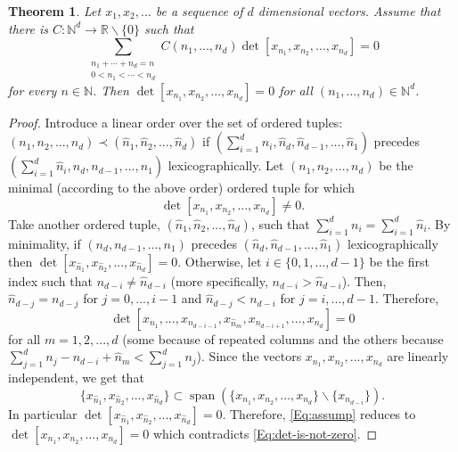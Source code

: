 \documentclass[12pt]{article}
\newcommand{\R}{{\mathbb{R}}}
\newcommand{\N}{{\mathbb{N}}}
\newtheorem*{theorem}{Theorem}
\DeclareMathOperator{\spn}{span}
\begin{document}
\begin{theorem} Let $x_1,x_2,...$ be a sequence of $d$ dimensional vectors. Assume that there is $C: \N^d \to \R \smallsetminus \{0\}$
such that
\begin{equation}\label{Eq:assump}
\sum_{\substack{n_1+\cdots+n_d=n \\ 0< n_1 < \cdots < n_d }}C(n_1,...,n_d) \det[x_{n_1},x_{n_2},...,x_{n_d}] = 0
\end{equation} for every $n \in \N$. Then $\det[x_{n_1},x_{n_2},...,x_{n_d}]\!=\!0$ for all $(n_1,...,n_d) \in \N^d$. \end{theorem}
\begin{proof}
Introduce a linear order over the set of ordered tuples: $(n_1,n_2,...,n_d) \prec (\hat{n}_1,\hat{n}_2,...,\hat{n}_d)$ if $\left(\sum_{i=1}^d n_i,\hat{n}_d,\hat{n}_{d-1},...,\hat{n}_1\right)$ precedes $\left(\sum_{i=1}^d\hat{n}_i,n_d,n_{d-1},...,n_1\right)$
lexicographically. Let $(n_1,n_2,...,n_d)$ be the minimal (according to the above order) ordered tuple for which
\begin{equation}\label{Eq:det-is-not-zero}
\det[x_{n_1},x_{n_2},...,x_{n_d}] \ne 0.
\end{equation}
Take another ordered tuple, $(\hat{n}_1,\hat{n}_2,...,\hat{n}_d)$, such that $\sum_{i=1}^d n_i = \sum_{i=1}^d \hat{n}_i$. By minimality, if
$(n_d,n_{d-1},...,n_1)$ precedes $(\hat{n}_d,\hat{n}_{d-1},...,\hat{n}_1)$ lexicographically then
$\det[x_{\hat{n}_1},x_{\hat{n}_2},...,x_{\hat{n}_d}]=0$. %
Otherwise, let $i \in \{0,1,...,d-1\}$ be the first index such that $n_{d-i} \ne \hat{n}_{d-i}$ (more specifically, $n_{d-i} > \hat{n}_{d-i}$). Then,
$\hat{n}_{d-j} = n_{d-j}$ for $j=0,...,i-1$ and $\hat{n}_{d-j} < n_{d-i}$ for $j=i,...,d-1$. Therefore,
\[\det[x_{n_1},...,x_{n_{d-i-1}},x_{\hat{n}_m},x_{n_{d-i+1}},...,x_{n_d}] = 0\] for all $m=1,2,...,d$ (some because of repeated columns and the others
because $\sum_{j=1}^d n_j - n_{d-i} + \hat{n}_m < \sum_{j=1}^d n_j$). Since the vectors $x_{n_1},x_{n_2},...,x_{n_d}$ are linearly independent, we get
that
\[\{x_{\hat{n}_1},x_{\hat{n}_2},...,x_{\hat{n}_d}\} \subset \spn \left(\{x_{n_1},x_{n_2},...,x_{n_d}\} \smallsetminus \{x_{n_{d-i}}\}\right).\]
In particular $\det[x_{\hat{n}_1},x_{\hat{n}_2},...,x_{\hat{n}_d}]=0$. Therefore, \eqref{Eq:assump} reduces to $\det[x_{n_1},x_{n_2},...,x_{n_d}]=0$
which contradicts \eqref{Eq:det-is-not-zero}.

\end{proof}
\end{document}
